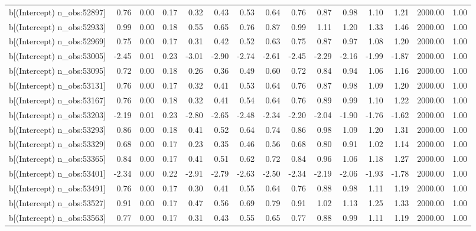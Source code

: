 \begin{table}[ht]
\begin{tabular}{rrrrrrrrrrrrrrr}
  b[(Intercept) n\_obs:52897] & 0.76 & 0.00 & 0.17 & 0.32 & 0.43 & 0.53 & 0.64 & 0.76 & 0.87 & 0.98 & 1.10 & 1.21 & 2000.00 & 1.00 \\ 
  b[(Intercept) n\_obs:52933] & 0.99 & 0.00 & 0.18 & 0.55 & 0.65 & 0.76 & 0.87 & 0.99 & 1.11 & 1.20 & 1.33 & 1.46 & 2000.00 & 1.00 \\ 
  b[(Intercept) n\_obs:52969] & 0.75 & 0.00 & 0.17 & 0.31 & 0.42 & 0.52 & 0.63 & 0.75 & 0.87 & 0.97 & 1.08 & 1.20 & 2000.00 & 1.00 \\ 
  b[(Intercept) n\_obs:53005] & -2.45 & 0.01 & 0.23 & -3.01 & -2.90 & -2.74 & -2.61 & -2.45 & -2.29 & -2.16 & -1.99 & -1.87 & 2000.00 & 1.00 \\ 
  b[(Intercept) n\_obs:53095] & 0.72 & 0.00 & 0.18 & 0.26 & 0.36 & 0.49 & 0.60 & 0.72 & 0.84 & 0.94 & 1.06 & 1.16 & 2000.00 & 1.00 \\ 
  b[(Intercept) n\_obs:53131] & 0.76 & 0.00 & 0.17 & 0.32 & 0.41 & 0.53 & 0.64 & 0.76 & 0.87 & 0.98 & 1.09 & 1.20 & 2000.00 & 1.00 \\ 
  b[(Intercept) n\_obs:53167] & 0.76 & 0.00 & 0.18 & 0.32 & 0.41 & 0.54 & 0.64 & 0.76 & 0.89 & 0.99 & 1.10 & 1.22 & 2000.00 & 1.00 \\ 
  b[(Intercept) n\_obs:53203] & -2.19 & 0.01 & 0.23 & -2.80 & -2.65 & -2.48 & -2.34 & -2.20 & -2.04 & -1.90 & -1.76 & -1.62 & 2000.00 & 1.00 \\ 
  b[(Intercept) n\_obs:53293] & 0.86 & 0.00 & 0.18 & 0.41 & 0.52 & 0.64 & 0.74 & 0.86 & 0.98 & 1.09 & 1.20 & 1.31 & 2000.00 & 1.00 \\ 
  b[(Intercept) n\_obs:53329] & 0.68 & 0.00 & 0.17 & 0.23 & 0.35 & 0.46 & 0.56 & 0.68 & 0.80 & 0.91 & 1.02 & 1.14 & 2000.00 & 1.00 \\ 
  b[(Intercept) n\_obs:53365] & 0.84 & 0.00 & 0.17 & 0.41 & 0.51 & 0.62 & 0.72 & 0.84 & 0.96 & 1.06 & 1.18 & 1.27 & 2000.00 & 1.00 \\ 
  b[(Intercept) n\_obs:53401] & -2.34 & 0.00 & 0.22 & -2.91 & -2.79 & -2.63 & -2.50 & -2.34 & -2.19 & -2.06 & -1.93 & -1.78 & 2000.00 & 1.00 \\ 
  b[(Intercept) n\_obs:53491] & 0.76 & 0.00 & 0.17 & 0.30 & 0.41 & 0.55 & 0.64 & 0.76 & 0.88 & 0.98 & 1.11 & 1.19 & 2000.00 & 1.00 \\ 
  b[(Intercept) n\_obs:53527] & 0.91 & 0.00 & 0.17 & 0.47 & 0.56 & 0.69 & 0.79 & 0.91 & 1.02 & 1.13 & 1.25 & 1.33 & 2000.00 & 1.00 \\ 
  b[(Intercept) n\_obs:53563] & 0.77 & 0.00 & 0.17 & 0.31 & 0.43 & 0.55 & 0.65 & 0.77 & 0.88 & 0.99 & 1.11 & 1.19 & 2000.00 & 1.00 \\ 

\end{tabular}
\end{table}
